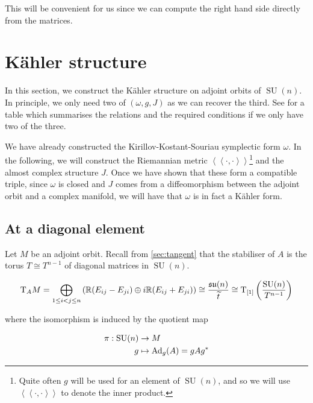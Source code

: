 \documentclass{article}
\DeclareMathOperator{\SU}{SU}
\newcommand{\su}{\mathfrak{su}}
\renewcommand{\tilde}{\widetilde}
\newcommand{\iinner}[1]{\left\langle\!\left\langle #1 \right\rangle\!\right\rangle}
\begin{document}
This will be convenient for us since we can compute the right hand side directly from the matrices.



\section{K\"ahler structure}

In this section, we construct the K\"ahler structure on adjoint orbits of \(\SU(n)\). In principle, we only need two of \((\omega, g, J)\) as we can recover the third. See  \cite[\S 13.2]{cannas_da_silva} for a table which summarises the relations and the required conditions if we only have two of the three.

We have already constructed the Kirillov-Kostant-Souriau symplectic form \(\omega\). In the following, we will construct the Riemannian metric \(\iinner{\cdot, \cdot}\)\footnote{Quite often \(g\) will be used for an element of \(\SU(n)\), and so we will use \(\iinner{\cdot, \cdot}\) to denote the inner product.} and the almost complex structure \(J\). Once we have shown that these form a compatible triple, since \(\omega\) is closed and \(J\) comes from a diffeomorphism between the adjoint orbit and a complex manifold, we will have that \(\omega\) is in fact a K\"ahler form.

\subsection{At a diagonal element}

Let \(M\) be an adjoint orbit. Recall from \cref{sec:tangent} that the stabiliser of \(A\) is the torus \(T \cong T^{n-1}\) of diagonal matrices in \(\SU(n)\).

\[\T_A M = \bigoplus_{1 \le i < j \le n} \left(\R(E_{ij} - E_{ji}) \oplus i\R (E_{ij} + E_{ji})\right) \cong \frac{\su(n)}{\tilde t} \cong \T_{[1]}\left(\frac{\SU(n)}{T^{n-1}}\right)\]

where the isomorphism is induced by the quotient map

\begin{align*}
    \pi : \SU(n) &\to M \\
    g &\mapsto \Ad_g(A) = gAg^*
\end{align*}
\end{document}

